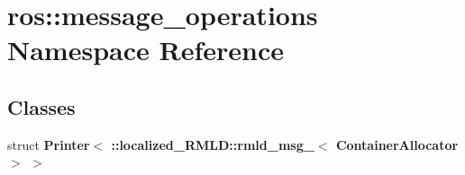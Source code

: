 \section{ros::message\_\-operations Namespace Reference}
\label{namespaceros_1_1message__operations}
\subsection*{Classes}
\begin{DoxyCompactItemize}
\item 
struct {\bf Printer$<$ ::localized\_\-RMLD::rmld\_\-msg\_\-$<$ ContainerAllocator $>$ $>$}
\end{DoxyCompactItemize}
